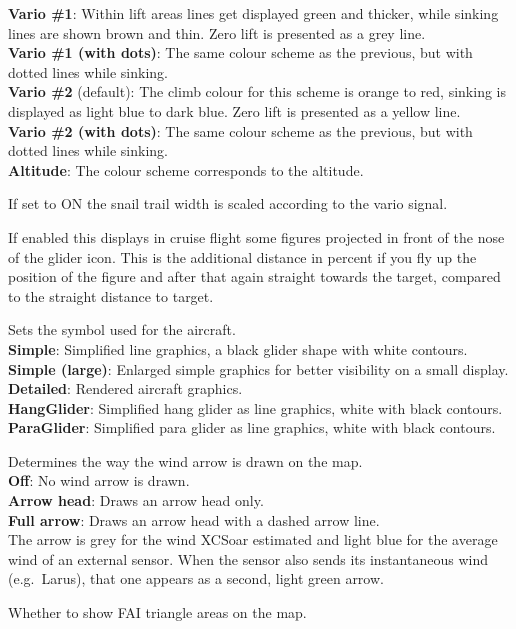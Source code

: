 \begin{description}
  {\bf Vario \#1}: Within lift areas lines get displayed green and
  thicker, while sinking lines are shown brown and thin.  Zero lift
  is presented as a grey line. \\
  {\bf Vario \#1 (with dots)}: The same colour scheme as the previous, but with dotted 
  lines while sinking. \\
  {\bf Vario \#2} (default): The climb colour for this scheme is orange to red,
  sinking is displayed as light blue to dark blue. Zero lift is presented as a
  yellow line. \\
  {\bf Vario \#2 (with dots)}: The same colour scheme as the previous, but with dotted 
  lines while sinking. \\
  {\bf Altitude}: The colour scheme corresponds to the altitude.
\item[Trail scaled*] \label{conf:trailscaled} If set to ON the snail trail 
  width is scaled according to the vario signal.
\item[Detour cost markers*]  If enabled this displays in cruise flight some
  figures projected in front of the nose of the glider icon.  This is the
  additional distance in percent if you fly up the position of the figure and
  after that again straight towards the target, compared to the straight distance
  to target.
\item[Aircraft symbol*]  Sets the symbol used for the aircraft. \\
  {\bf Simple}: Simplified line graphics, a black glider shape with white contours. \\
  {\bf Simple (large)}: Enlarged simple graphics for better visibility on a small display. \\
  {\bf Detailed}: Rendered aircraft graphics. \\
  {\bf HangGlider}: Simplified hang glider as line graphics, white with black contours. \\
  {\bf ParaGlider}: Simplified para glider as line graphics, white with black contours.
\item[Wind arrow*]  Determines the way the wind arrow is drawn on the map. \\
  {\bf Off}: No wind arrow is drawn. \\
  {\bf Arrow head}: Draws an arrow head only. \\
  {\bf Full arrow}: Draws an arrow head with a dashed arrow line. \\
  The arrow is grey for the wind XCSoar estimated and light blue for
  the average wind of an external sensor.  When the sensor also sends
  its instantaneous wind (e.g.\ Larus), that one appears as a second,
  light green arrow.
\item[FAI triangle areas] Whether to show FAI triangle areas on the map.
  
\end{description}


